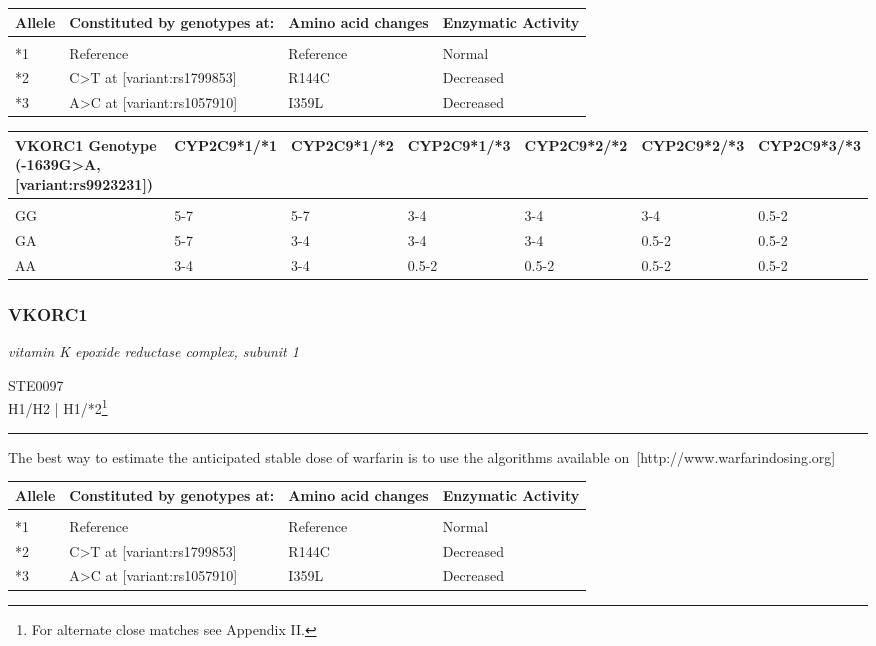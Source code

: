 \documentclass{report}
\begin{document}
      \begin{tabularx}{\textwidth}{ XXXX }
      \textbf{ Allele }&\textbf{ Constituted by genotypes at:}&\textbf{ Amino acid changes }&\textbf{ Enzymatic Activity } \\ \hline \\  *1 & Reference & Reference & Normal  \\  *2 & C>T at [variant:rs1799853] & R144C & Decreased  \\  *3 & A>C at [variant:rs1057910] & I359L & Decreased  \\ 
      \end{tabularx}
      
      \begin{tabularx}{\textwidth}{ XXXXXXX }
      \textbf{ VKORC1 Genotype (-1639G>A, [variant:rs9923231]) }&\textbf{ CYP2C9*1/*1 }&\textbf{ CYP2C9*1/*2 }&\textbf{ CYP2C9*1/*3 }&\textbf{ CYP2C9*2/*2 }&\textbf{ CYP2C9*2/*3 }&\textbf{ CYP2C9*3/*3} \\ \hline \\  GG & 5-7 & 5-7 & 3-4 & 3-4 & 3-4 & 0.5-2 \\  GA & 5-7 & 3-4 & 3-4 & 3-4 & 0.5-2 & 0.5-2 \\  AA & 3-4  & 3-4 & 0.5-2 & 0.5-2 & 0.5-2 & 0.5-2 \\ 
      \end{tabularx}
      
      \newpage
      \normalsize\subsubsection{ VKORC1 }
     \textit{ vitamin K epoxide reductase complex, subunit 1 } \begin{flushright} \textsc{ STE0097 \\ H1/H2  | H1/*2\footnote{For alternate close matches see Appendix II.} }\end{flushright}
      \hrule \vspace{6pt}
      The best way to estimate the anticipated stable dose of warfarin is to use the algorithms available on [http://www.warfarindosing.org] \newline
      \scriptsize
      
      \begin{tabularx}{\textwidth}{ XXXX }
      \textbf{ Allele }&\textbf{ Constituted by genotypes at:}&\textbf{ Amino acid changes }&\textbf{ Enzymatic Activity } \\ \hline \\  *1 & Reference & Reference & Normal  \\  *2 & C>T at [variant:rs1799853] & R144C & Decreased  \\  *3 & A>C at [variant:rs1057910] & I359L & Decreased  \\ 
      \end{tabularx}
      
\end{document}

